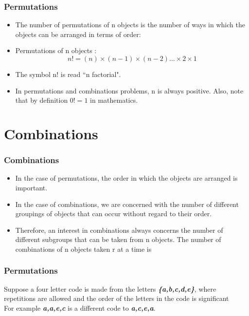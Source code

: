 \documentclass[IntroMain.tex]{subfiles}
\begin{document}
\begin{frame}
	\frametitle{Permutations}
\large
\begin{itemize}
\item The number of permutations of n objects is the number of ways in which the objects can be arranged in
terms of order: \item
Permutations of n objects : \[n! = (n) \times (n - 1) \times (n-2) \ldots  \times 2 \times 1 \]
\item

The symbol n! is read ``n factorial". 
\item In permutations and combinations problems, n is always positive.
Also, note that by definition $0! = 1$ in mathematics.
	\end{itemize}
\end{frame}

\section{Combinations}
\begin{frame}
\frametitle{Combinations}
\begin{itemize}
\item In the case of permutations, the order in which the objects are arranged is important.
\item In the case of
combinations, we are concerned with the number of different groupings of objects that can occur without regard
to their order. 
\item Therefore, an interest in combinations always concerns the number of different subgroups that
can be taken from n objects. The number of combinations of n objects taken r at a time is
\end{itemize}	
\end{frame}
\begin{frame}
\frametitle{Permutations}
\Large
\vspace{-1.0cm}
Suppose a four letter code is made from the letters \textbf{\textit{\{a,b,c,d,e\}}}, where repetitions are allowed and the order of the letters in the code is significant\\ \bigskip For example
\textbf{\textit{a,a,e,c}} is a different code to \textbf{\textit{a,c,e,a}}.
\end{frame}
\end{document}
